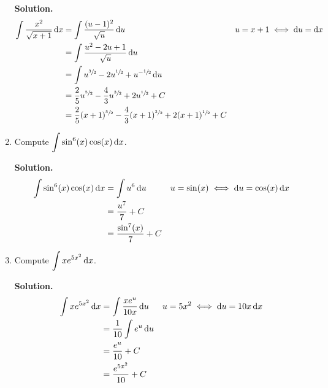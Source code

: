 \begin{Example}{}{}
\begin{enumerate}[label=(\roman*)]
              \textbf{Solution.}
              \begin{align*}
                  \int \frac{x^2}{\sqrt{x+1}} \odif{x}
                   & =\int \frac{(u-1)^2}{\sqrt{u}} \odif{u}                                                    &  & u=x+1\iff \odif{u}=\odif{x} \\
                   & =\int \frac{u^2-2u+1}{\sqrt{u}} \odif{u}                                                                                    \\
                   & =\int u^{\sfrac{3}{2}}-2u^{\sfrac{1}{2}}+u^{-\sfrac{1}{2}}\odif{u}                                                          \\
                   & =\frac{2}{5} u^{\sfrac{5}{2} }-\frac{4}{3}u^{\sfrac{3}{2}}+2u^{\sfrac{1}{2}}+C                                              \\
                   & =\frac{2}{5} (x+1)^{\sfrac{5}{2} }-\frac{4}{3}(x+1)^{\sfrac{3}{2}}+2(x+1)^{\sfrac{1}{2}}+C
              \end{align*}
        \item Compute
              $ \displaystyle \int \sin^6(x)\cos(x)\odif{x} $.

              \textbf{Solution.}
              \begin{align*}
                  \int \sin^6(x)\cos(x)\odif{x}
                   & =\int u^6\odif{u}       &  & u=\sin(x)\iff \odif{u}=\cos(x)\odif{x} \\
                   & =\frac{u^7}{7}+C                                                    \\
                   & =\frac{\sin^7(x)}{7} +C
              \end{align*}
        \item Compute $ \displaystyle  \int x e^{5x^2}\odif{x} $.

              \textbf{Solution.}
              \begin{align*}
                  \int x e^{5x^2}\odif{x}
                   & =\int \frac{xe^u}{10x} \odif{u} &  & u=5x^2\iff \odif{u}=10x\odif{x} \\
                   & =\frac{1}{10} \int e^u\odif{u}                                       \\
                   & =\frac{e^u}{10} +C                                                   \\
                   & =\frac{e^{5x^2}}{10} +C
              \end{align*}
    \end{enumerate}
\end{Example}

